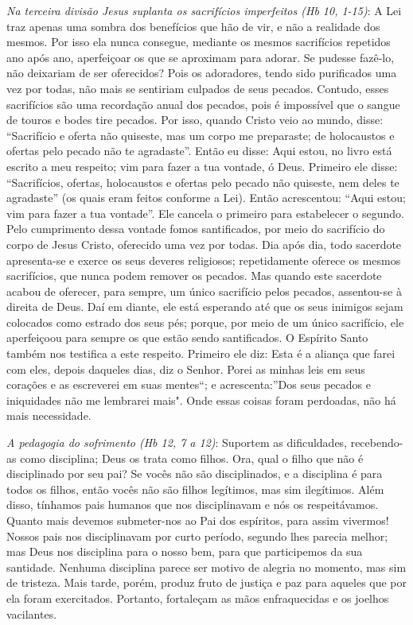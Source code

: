 \documentclass[
]{book}
\begin{document}
\begin{itemize}
  \emph{Na terceira divisão Jesus suplanta os sacrifícios imperfeitos (Hb 10, 1-15)}: A Lei traz apenas uma sombra dos benefícios que hão de vir, e não a realidade dos mesmos. Por isso ela nunca consegue, mediante os mesmos sacrifícios repetidos ano após ano, aperfeiçoar os que se aproximam para adorar. Se pudesse fazê-lo, não deixariam de ser oferecidos? Pois os adoradores, tendo sido purificados uma vez por todas, não mais se sentiriam culpados de seus pecados. Contudo, esses sacrifícios são uma recordação anual dos pecados, pois é impossível que o sangue de touros e bodes tire pecados. Por isso, quando Cristo veio ao mundo, disse: ``Sacrifício e oferta não quiseste, mas um corpo me preparaste; de holocaustos e ofertas pelo pecado não te agradaste''. Então eu disse: Aqui estou, no livro está escrito a meu respeito; vim para fazer a tua vontade, ó Deus. Primeiro ele disse: ``Sacrifícios, ofertas, holocaustos e ofertas pelo pecado não quiseste, nem deles te agradaste'' (os quais eram feitos conforme a Lei). Então acrescentou: ``Aqui estou; vim para fazer a tua vontade''. Ele cancela o primeiro para estabelecer o segundo. Pelo cumprimento dessa vontade fomos santificados, por meio do sacrifício do corpo de Jesus Cristo, oferecido uma vez por todas. Dia após dia, todo sacerdote apresenta-se e exerce os seus deveres religiosos; repetidamente oferece os mesmos sacrifícios, que nunca podem remover os pecados. Mas quando este sacerdote acabou de oferecer, para sempre, um único sacrifício pelos pecados, assentou-se à direita de Deus. Daí em diante, ele está esperando até que os seus inimigos sejam colocados como estrado dos seus pés; porque, por meio de um único sacrifício, ele aperfeiçoou para sempre os que estão sendo santificados. O Espírito Santo também nos testifica a este respeito. Primeiro ele diz: Esta é a aliança que farei com eles, depois daqueles dias, diz o Senhor. Porei as minhas leis em seus corações e as escreverei em suas mentes``; e acrescenta:''Dos seus pecados e iniquidades não me lembrarei mais". Onde essas coisas foram perdoadas, não há mais necessidade.
\end{itemize}

\emph{A pedagogia do sofrimento (Hb 12, 7 a 12)}: Suportem as dificuldades, recebendo-as como disciplina; Deus os trata como filhos. Ora, qual o filho que não é disciplinado por seu pai? Se vocês não são disciplinados, e a disciplina é para todos os filhos, então vocês não são filhos legítimos, mas sim ilegítimos. Além disso, tínhamos pais humanos que nos disciplinavam e nós os respeitávamos. Quanto mais devemos submeter-nos ao Pai dos espíritos, para assim vivermos! Nossos pais nos disciplinavam por curto período, segundo lhes parecia melhor; mas Deus nos disciplina para o nosso bem, para que participemos da sua santidade. Nenhuma disciplina parece ser motivo de alegria no momento, mas sim de tristeza. Mais tarde, porém, produz fruto de justiça e paz para aqueles que por ela foram exercitados. Portanto, fortaleçam as mãos enfraquecidas e os joelhos vacilantes.
\end{document}
